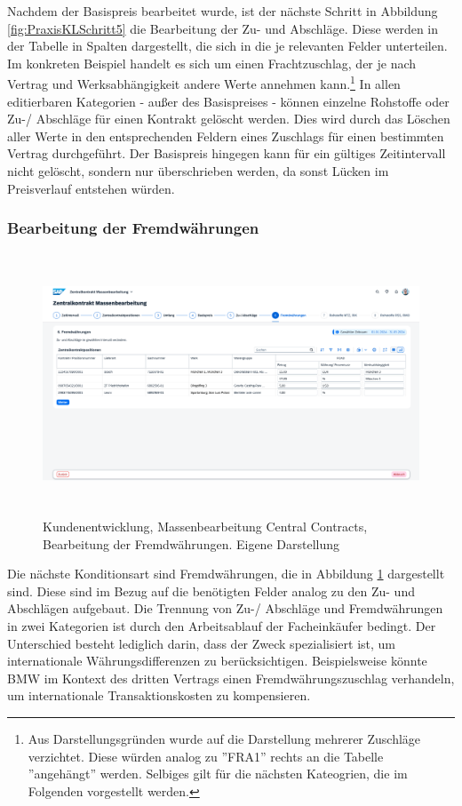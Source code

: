 Nachdem der Basispreis bearbeitet wurde, ist der nächste Schritt in Abbildung \ref{fig:PraxisKLSchritt5} die Bearbeitung der Zu- und Abschläge. Diese werden in der Tabelle in Spalten dargestellt, die sich in die je relevanten Felder unterteilen. Im konkreten Beispiel handelt es sich um einen Frachtzuschlag, der je nach Vertrag und Werksabhängigkeit andere Werte annehmen kann.\footnote{Aus Darstellungsgründen wurde auf die Darstellung mehrerer Zuschläge verzichtet. Diese würden analog zu ''FRA1'' rechts an die Tabelle ''angehängt'' werden. Selbiges gilt für die nächsten Kateogrien, die im Folgenden vorgestellt werden.} In allen editierbaren Kategorien - au\ss er des Basispreises - können \zB einzelne Rohstoffe oder Zu-/ Abschläge für einen Kontrakt gelöscht werden. Dies wird durch das Löschen aller Werte in den entsprechenden Feldern eines Zuschlags für einen bestimmten Vertrag durchgeführt. Der Basispreis hingegen kann für ein gültiges Zeitintervall nicht gelöscht, sondern nur überschrieben werden, da sonst Lücken im Preisverlauf entstehen würden. 

\subsubsection{Bearbeitung der Fremdwährungen}

\begin{figure}[H]
    \centering
    \includegraphics[height=7.78cm]{Bilder/Praxisteil-KL-Schritt-6.png}
    \caption[Kundenentwicklung, Massenbearbeitung Central Contracts, Bearbeitung der Fremdwährungen]{Kundenentwicklung, Massenbearbeitung Central Contracts, Bearbeitung der Fremdwährungen. Eigene Darstellung}
    \label{fig:PraxisKLSchritt6}
\end{figure}

Die nächste Konditionsart sind Fremdwährungen, die in Abbildung \ref{fig:PraxisKLSchritt6} dargestellt sind. Diese sind im Bezug auf die benötigten Felder analog zu den Zu- und Abschlägen aufgebaut. Die Trennung von Zu-/ Abschläge und Fremdwährungen in zwei Kategorien ist durch den Arbeitsablauf der Facheinkäufer bedingt. Der Unterschied besteht lediglich darin, dass der Zweck spezialisiert ist, um internationale Währungsdifferenzen zu berücksichtigen. Beispielsweise könnte BMW im Kontext des dritten Vertrags einen Fremdwährungszuschlag verhandeln, um internationale Transaktionskosten zu kompensieren.

